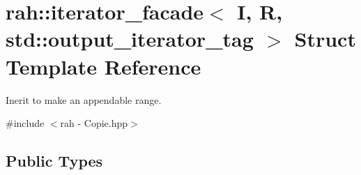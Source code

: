 \hypertarget{structrah_1_1iterator__facade_3_01_i_00_01_r_00_01std_1_1output__iterator__tag_01_4}{}\section{rah\+::iterator\+\_\+facade$<$ I, R, std\+::output\+\_\+iterator\+\_\+tag $>$ Struct Template Reference}
\label{structrah_1_1iterator__facade_3_01_i_00_01_r_00_01std_1_1output__iterator__tag_01_4}


Inerit to make an appendable range.  




{\ttfamily \#include $<$rah -\/ Copie.\+hpp$>$}

\subsection*{Public Types}
